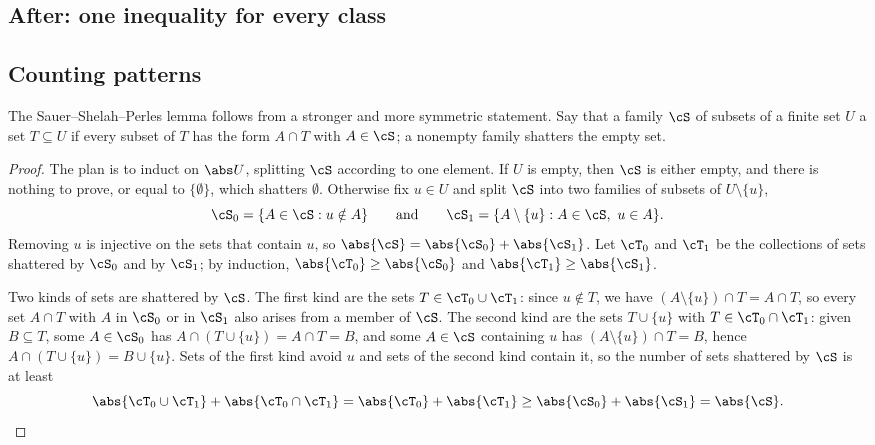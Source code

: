 \begin{refsection}[chapters/11-vc.bib]
\section{After: one inequality for every class}\label{sec:vc:after1}

\subsection{Counting patterns}\label{sec:vc:counting}

The Sauer--Shelah--Perles lemma follows from a stronger and more symmetric statement. Say that a family $\cS$ of subsets of a finite set $U$  a set $T\subseteq U$ if every subset of $T$ has the form $A\cap T$ with $A\in\cS$; a nonempty family shatters the empty set.


\begin{proof}
The plan is to induct on $\abs U$, splitting $\cS$ according to one element. If $U$ is empty, then $\cS$ is either empty, and there is nothing to prove, or equal to $\{\emptyset\}$, which shatters $\emptyset$. Otherwise fix $u\in U$ and split $\cS$ into two families of subsets of $U\setminus\{u\}$,
\[
  \cS_0 = \{A\in\cS: u\notin A\}\qquad\text{and}\qquad \cS_1 = \{A\setminus\{u\}: A\in\cS,\ u\in A\}.
\]
Removing $u$ is injective on the sets that contain $u$, so $\abs{\cS} = \abs{\cS_0}+\abs{\cS_1}$. Let $\cT_0$ and $\cT_1$ be the collections of sets shattered by $\cS_0$ and by $\cS_1$; by induction, $\abs{\cT_0}\ge\abs{\cS_0}$ and $\abs{\cT_1}\ge\abs{\cS_1}$.

Two kinds of sets are shattered by $\cS$. The first kind are the sets $T\in\cT_0\cup\cT_1$: since $u\notin T$, we have $(A\setminus\{u\})\cap T = A\cap T$, so every set $A\cap T$ with $A$ in $\cS_0$ or in $\cS_1$ also arises from a member of $\cS$. The second kind are the sets $T\cup\{u\}$ with $T\in\cT_0\cap\cT_1$: given $B\subseteq T$, some $A\in\cS_0$ has $A\cap(T\cup\{u\}) = A\cap T = B$, and some $A\in\cS$ containing $u$ has $(A\setminus\{u\})\cap T = B$, hence $A\cap(T\cup\{u\}) = B\cup\{u\}$. Sets of the first kind avoid $u$ and sets of the second kind contain it, so the number of sets shattered by $\cS$ is at least
\[
  \abs{\cT_0\cup\cT_1}+\abs{\cT_0\cap\cT_1} = \abs{\cT_0}+\abs{\cT_1}\ge\abs{\cS_0}+\abs{\cS_1} = \abs{\cS} . \qedhere
\]
\end{proof}


\end{refsection}

